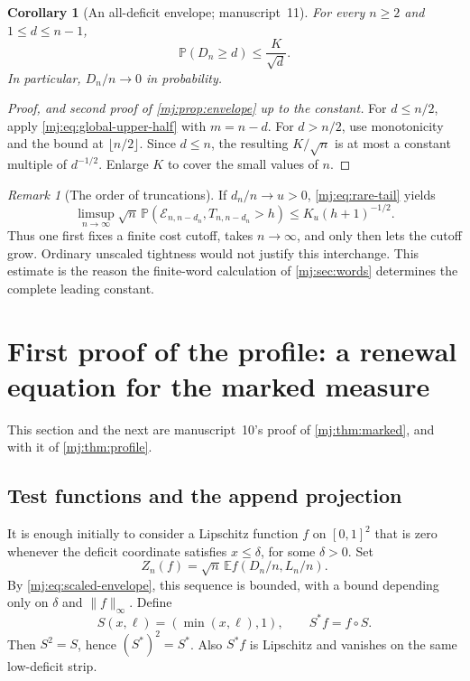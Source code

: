 \documentclass[11pt,a4paper]{article}
\newtheorem{corollary}[corollary]{Corollary}
\theoremstyle{definition}\newaliascnt{definition}{theorem}
\theoremstyle{remark}\newaliascnt{remark}{theorem}
\newtheorem{remark}[remark]{Remark}
\newcommand{\ljP}{\mathbb P}
\newcommand{\ljE}{\mathbb E}
\begin{document}
\begin{corollary}[An all-deficit envelope; manuscript~11]
\label{mj:cor:all-tail}
For every $n\ge2$ and $1\le d\le n-1$,
\begin{equation}
 \ljP(D_n\ge d)\le\frac{K}{\sqrt d}.
 \label{mj:eq:all-tail}
\end{equation}
In particular, $D_n/n\to0$ in probability.
\end{corollary}
\begin{proof}[Proof, and second proof of \cref{mj:prop:envelope} up to the constant]
For $d\le n/2$, apply \eqref{mj:eq:global-upper-half} with $m=n-d$. For
$d>n/2$, use monotonicity and the bound at $\lfloor n/2\rfloor$. Since
$d\le n$, the resulting $K/\sqrt n$ is at most a constant multiple of
$d^{-1/2}$. Enlarge $K$ to cover the small values of $n$.
\end{proof}

\begin{remark}[The order of truncations]
If $d_n/n\to u>0$, \eqref{mj:eq:rare-tail} yields
\[
 \limsup_{n\to\infty}\sqrt n\,
 \ljP(\mathcal E_{n,n-d_n},T_{n,n-d_n}>h)\le K_u(h+1)^{-1/2}.
\]
Thus one first fixes a finite cost cutoff, takes $n\to\infty$, and only then
lets the cutoff grow. Ordinary unscaled tightness would not justify this
interchange. This estimate is the reason the finite-word calculation of
\cref{mj:sec:words} determines the complete leading constant.
\end{remark}

\section{First proof of the profile: a renewal equation for the marked measure}
\label{mj:sec:renewal}
This section and the next are manuscript~10's proof of
\cref{mj:thm:marked}, and with it of \cref{mj:thm:profile}.

\subsection{Test functions and the append projection}
It is enough initially to consider a Lipschitz function $f$ on $[0,1]^2$
that is zero whenever the deficit coordinate satisfies $x\le\delta$, for
some $\delta>0$. Set
\begin{equation}
 Z_n(f)=\sqrt n\,\ljE f(D_n/n,L_n/n).
 \label{mj:eq:Zn}
\end{equation}
By \eqref{mj:eq:scaled-envelope}, this sequence is bounded, with a bound
depending only on $\delta$ and $\|f\|_\infty$. Define
\begin{equation}
 S(x,\ell)=(\min(x,\ell),1),\qquad S^\ast f=f\circ S.
 \label{mj:eq:S}
\end{equation}
Then $S^2=S$, hence $(S^\ast)^2=S^\ast$. Also $S^\ast f$ is Lipschitz and
vanishes on the same low-deficit strip.
\end{document}
